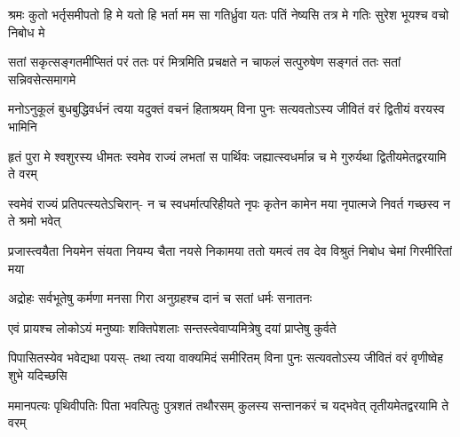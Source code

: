 \begin{center}



\fourlineindentedshloka
{श्रमः कुतो भर्तृसमीपतो हि मे}
{यतो हि भर्ता मम सा गतिर्ध्रुवा}
{यतः पतिं नेष्यसि तत्र मे गतिः}
{सुरेश भूयश्च वचो निबोध मे}


\fourlineindentedshloka
{सतां सकृत्सङ्गतमीप्सितं परं}
{ततः परं मित्रमिति प्रचक्षते}
{न चाफलं सत्पुरुषेण सङ्गतं}
{ततः सतां सन्निवसेत्समागमे}




\fourlineindentedshloka
{मनोऽनुकूलं बुधबुद्धिवर्धनं}
{त्वया यदुक्तं वचनं हिताश्रयम्}
{विना पुनः सत्यवतोऽस्य जीवितं}
{वरं द्वितीयं वरयस्व भामिनि}




\fourlineindentedshloka
{हृतं पुरा मे श्वशुरस्य धीमतः}
{स्वमेव राज्यं लभतां स पार्थिवः}
{जह्यात्स्वधर्मान्न च मे गुरुर्यथा}
{द्वितीयमेतद्वरयामि ते वरम्}




\fourlineindentedshloka
{स्वमेवं राज्यं प्रतिपत्स्यतेऽचिरान्-}
{न च स्वधर्मात्परिहीयते नृपः}
{कृतेन कामेन मया नृपात्मजे}
{निवर्त गच्छस्व न ते श्रमो भवेत्}




\fourlineindentedshloka
{प्रजास्त्वयैता नियमेन संयता}
{नियम्य चैता नयसे निकामया}
{ततो यमत्वं तव देव विश्रुतं}
{निबोध चेमां गिरमीरितां मया}


\twolineshloka
{अद्रोहः सर्वभूतेषु कर्मणा मनसा गिरा}
{अनुग्रहश्च दानं च सतां धर्मः सनातनः}


\twolineshloka
{एवं प्रायश्च लोकोऽयं मनुष्याः शक्तिपेशलाः}
{सन्तस्त्वेवाप्यमित्रेषु दयां प्राप्तेषु कुर्वते}




\fourlineindentedshloka
{पिपासितस्येव भवेद्यथा पयस्-}
{तथा त्वया वाक्यमिदं समीरितम्}
{विना पुनः सत्यवतोऽस्य जीवितं}
{वरं वृणीष्वेह शुभे यदिच्छसि}




\fourlineindentedshloka
{ममानपत्यः पृथिवीपतिः पिता}
{भवत्पितुः पुत्रशतं तथौरसम्}
{कुलस्य सन्तानकरं च यद्भवेत्}
{तृतीयमेतद्वरयामि ते वरम्}





\end{center}
